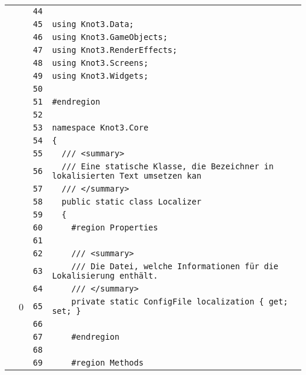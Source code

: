 \documentclass[a4paper,10pt]{article}
\begin{document}
\begin{longtable}[l]{lrrl}
\cellcolor{gray} &  & \verb~44~ & \verb~~\\
\cellcolor{gray} &  & \verb~45~ & \verb~using Knot3.Data;~\\
\cellcolor{gray} &  & \verb~46~ & \verb~using Knot3.GameObjects;~\\
\cellcolor{gray} &  & \verb~47~ & \verb~using Knot3.RenderEffects;~\\
\cellcolor{gray} &  & \verb~48~ & \verb~using Knot3.Screens;~\\
\cellcolor{gray} &  & \verb~49~ & \verb~using Knot3.Widgets;~\\
\cellcolor{gray} &  & \verb~50~ & \verb~~\\
\cellcolor{gray} &  & \verb~51~ & \verb~#endregion~\\
\cellcolor{gray} &  & \verb~52~ & \verb~~\\
\cellcolor{gray} &  & \verb~53~ & \verb~namespace Knot3.Core~\\
\cellcolor{gray} &  & \verb~54~ & \verb~{~\\
\cellcolor{gray} &  & \verb~55~ & \verb~  /// <summary>~\\
\cellcolor{gray} &  & \verb~56~ & \verb~  /// Eine statische Klasse, die Bezeichner in lokalisierten Text umsetzen kan~\\
\cellcolor{gray} &  & \verb~57~ & \verb~  /// </summary>~\\
\cellcolor{gray} &  & \verb~58~ & \verb~  public static class Localizer~\\
\cellcolor{gray} &  & \verb~59~ & \verb~  {~\\
\cellcolor{gray} &  & \verb~60~ & \verb~    #region Properties~\\
\cellcolor{gray} &  & \verb~61~ & \verb~~\\
\cellcolor{gray} &  & \verb~62~ & \verb~    /// <summary>~\\
\cellcolor{gray} &  & \verb~63~ & \verb~    /// Die Datei, welche Informationen für die Lokalisierung enthält.~\\
\cellcolor{gray} &  & \verb~64~ & \verb~    /// </summary>~\\
\cellcolor{red} & 0 & \verb~65~ & \verb~    private static ConfigFile localization { get; set; }~\\
\cellcolor{gray} &  & \verb~66~ & \verb~~\\
\cellcolor{gray} &  & \verb~67~ & \verb~    #endregion~\\
\cellcolor{gray} &  & \verb~68~ & \verb~~\\
\cellcolor{gray} &  & \verb~69~ & \verb~    #region Methods~\\

\end{longtable}
\end{document}
